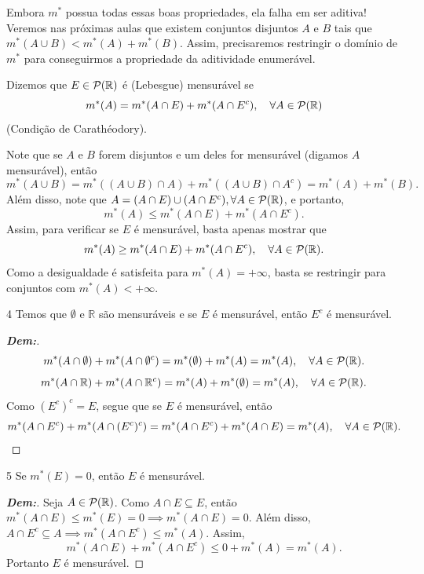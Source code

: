 Embora $m^*$ possua todas essas boas propriedades, ela falha em ser aditiva! Veremos nas próximas aulas que existem conjuntos disjuntos $A$ e $B$ tais que $m^*(A \cup B) < m^*(A) + m^*(B)$. Assim, precisaremos restringir o domínio de $m^*$ para conseguirmos a propriedade da aditividade enumerável.

\begin{definition*}{}
Dizemos que $E \in \mathcal{P}(\mathbb{R})$ é (Lebesgue) mensurável se
$$ m^*(A) = m^*(A \cap E) + m^*(A \cap E^c), \quad \forall A \in \mathcal{P}(\mathbb{R}) $$
(Condição de Carathéodory).
\end{definition*}

\noindent
Note que se $A$ e $B$ forem disjuntos e um deles for mensurável (digamos $A$ mensurável), então
$$ m^*(A \cup B) = m^*((A \cup B) \cap A) + m^*((A \cup B) \cap A^c) = m^*(A) + m^*(B). $$
Além disso, note que $A = (A \cap E) \cup (A \cap E^c), \forall A \in \mathcal{P}(\mathbb{R})$, e portanto,
$$ m^*(A) \le m^*(A \cap E) + m^*(A \cap E^c). $$
Assim, para verificar se $E$ é mensurável, basta apenas mostrar que
$$ m^*(A) \ge m^*(A \cap E) + m^*(A \cap E^c), \quad \forall A \in \mathcal{P}(\mathbb{R}). $$
Como a desigualdade é satisfeita para $m^*(A) = +\infty$, basta se restringir para conjuntos com $m^*(A) < +\infty$.

\begin{prop*}{4}
Temos que $\emptyset$ e $\mathbb{R}$ são mensuráveis e se $E$ é mensurável, então $E^c$ é mensurável.
\end{prop*}

\begin{proof}[\textbf{Dem:}]
$$ m^*(A \cap \emptyset) + m^*(A \cap \emptyset^c) = m^*(\emptyset) + m^*(A) = m^*(A), \quad \forall A \in \mathcal{P}(\mathbb{R}). $$
$$ m^*(A \cap \mathbb{R}) + m^*(A \cap \mathbb{R}^c) = m^*(A) + m^*(\emptyset) = m^*(A), \quad \forall A \in \mathcal{P}(\mathbb{R}). $$
Como $(E^c)^c = E$, segue que se $E$ é mensurável, então
$$ m^*(A \cap E^c) + m^*(A \cap (E^c)^c) = m^*(A \cap E^c) + m^*(A \cap E) = m^*(A), \quad \forall A \in \mathcal{P}(\mathbb{R}). $$
\end{proof}

\begin{prop*}{5}
Se $m^*(E) = 0$, então $E$ é mensurável.
\end{prop*}

\begin{proof}[\textbf{Dem:}]
Seja $A \in \mathcal{P}(\mathbb{R})$. Como $A \cap E \subseteq E$, então $m^*(A \cap E) \le m^*(E) = 0 \implies m^*(A \cap E) = 0$.
Além disso, $A \cap E^c \subseteq A \implies m^*(A \cap E^c) \le m^*(A)$.
Assim,
$$ m^*(A \cap E) + m^*(A \cap E^c) \le 0 + m^*(A) = m^*(A). $$
Portanto $E$ é mensurável.
\end{proof}

